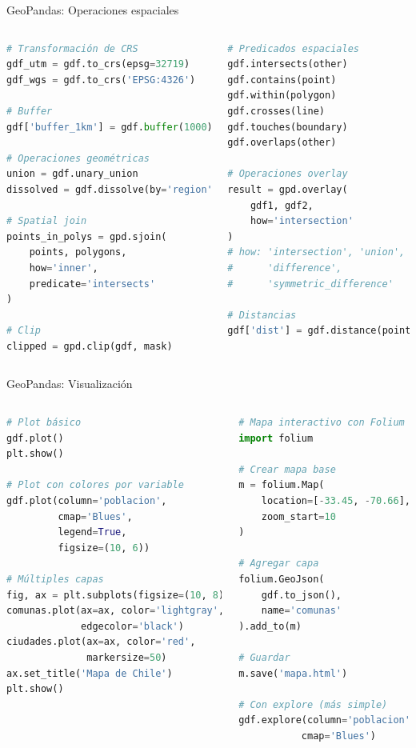 \documentclass[10pt,aspectratio=169]{beamer}
\begin{document}
\begin{frame}[fragile]{GeoPandas: Operaciones espaciales}
    \begin{columns}[T]
        \begin{lstlisting}[language=Python]
# Transformación de CRS
gdf_utm = gdf.to_crs(epsg=32719)
gdf_wgs = gdf.to_crs('EPSG:4326')

# Buffer
gdf['buffer_1km'] = gdf.buffer(1000)

# Operaciones geométricas
union = gdf.unary_union
dissolved = gdf.dissolve(by='region')

# Spatial join
points_in_polys = gpd.sjoin(
    points, polygons, 
    how='inner', 
    predicate='intersects'
)

# Clip
clipped = gpd.clip(gdf, mask)
        \end{lstlisting}
        
        \begin{lstlisting}[language=Python]
# Predicados espaciales
gdf.intersects(other)
gdf.contains(point)
gdf.within(polygon)
gdf.crosses(line)
gdf.touches(boundary)
gdf.overlaps(other)

# Operaciones overlay
result = gpd.overlay(
    gdf1, gdf2, 
    how='intersection'
)
# how: 'intersection', 'union',
#      'difference', 
#      'symmetric_difference'

# Distancias
gdf['dist'] = gdf.distance(point)
        \end{lstlisting}
    \end{columns}
\end{frame}

\begin{frame}[fragile]{GeoPandas: Visualización}
    \begin{columns}[T]
        \begin{lstlisting}[language=Python]
# Plot básico
gdf.plot()
plt.show()

# Plot con colores por variable
gdf.plot(column='poblacion', 
         cmap='Blues',
         legend=True,
         figsize=(10, 6))

# Múltiples capas
fig, ax = plt.subplots(figsize=(10, 8))
comunas.plot(ax=ax, color='lightgray',
             edgecolor='black')
ciudades.plot(ax=ax, color='red', 
              markersize=50)
ax.set_title('Mapa de Chile')
plt.show()
        \end{lstlisting}
        
        \begin{lstlisting}[language=Python]
# Mapa interactivo con Folium
import folium

# Crear mapa base
m = folium.Map(
    location=[-33.45, -70.66],
    zoom_start=10
)

# Agregar capa
folium.GeoJson(
    gdf.to_json(),
    name='comunas'
).add_to(m)

# Guardar
m.save('mapa.html')

# Con explore (más simple)
gdf.explore(column='poblacion',
           cmap='Blues')
        \end{lstlisting}
    \end{columns}
\end{frame}
\end{document}
